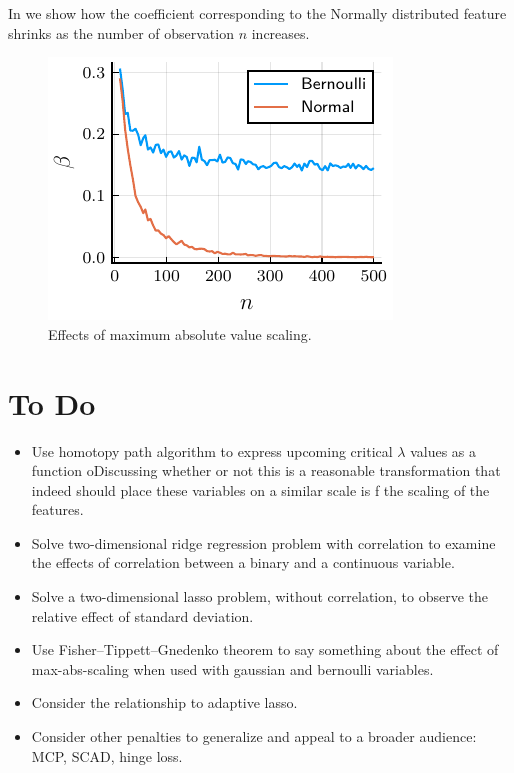 In  we show how the coefficient corresponding to the Normally distributed feature shrinks as the number of observation \(n\) increases.

\begin{figure}[htpb]
  \centering
  \includegraphics[]{plots/maxabs_n.pdf}
  \caption{%
    Effects of maximum absolute value scaling.
  }
  \label{fig:maxabs-n}
\end{figure}

\section{To Do}

\begin{itemize}
  \item Use homotopy path algorithm to express upcoming critical \(\lambda\) values as a function oDiscussing whether or not this is a reasonable transformation that indeed should place these variables on a similar scale is f the scaling of the features.
  \item Solve two-dimensional ridge regression problem with correlation to examine the effects of correlation between a binary and a continuous variable.
  \item Solve a two-dimensional lasso problem, without correlation, to observe the relative effect of standard deviation.
  \item Use Fisher–Tippett–Gnedenko theorem to say something about the effect of max-abs-scaling when used with gaussian and bernoulli variables.
  \item Consider the relationship to adaptive lasso.
  \item Consider other penalties to generalize and appeal to a broader audience: MCP, SCAD, hinge loss.
\end{itemize}

